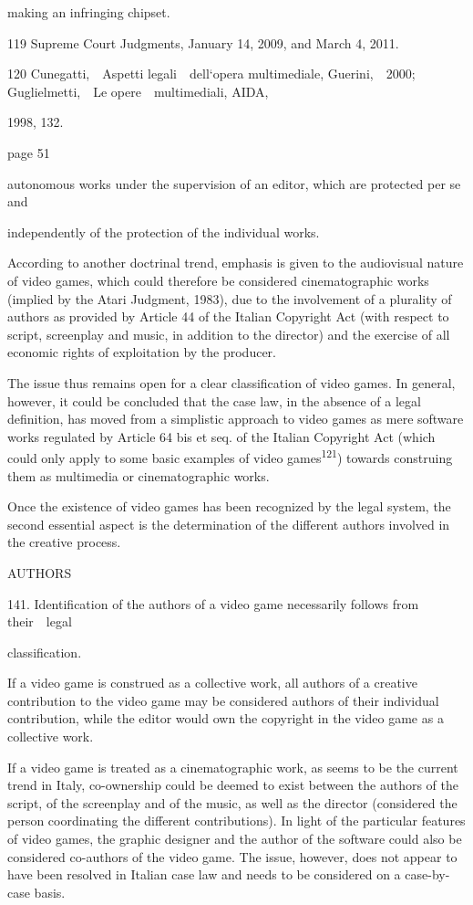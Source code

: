 \documentclass[
]{article}
\begin{document}
{making an infringing chipset.}

{119 }{Supreme Court Judgments, January 14, 2009, and March 4, 2011.}

{120 }{Cunegatti,~~}{Aspetti legali~~dell`opera multimediale}{,
Guerini,~~2000; Guglielmetti,~~}{Le opere~~multimediali}{, AIDA,}

{1998, 132.}

{page 51}

{autonomous works under the supervision of an editor, which are
protected }{per se }{and}

{independently of the protection of the individual works.}

{According to another doctrinal trend, emphasis is given to the
audiovisual nature of video games, which could therefore be considered
cinematographic works (implied by the Atari Judgment, 1983), due to the
involvement of a plurality of authors as provided by Article 44 of the
Italian }{Copyright Act }{(with respect to script, screenplay and music,
in addition to the director) and the exercise of all economic rights of
exploitation by the producer.}

{The issue thus remains open for a clear classification of video games.
In general, however, it could be concluded that the case law, in the
absence of a legal definition, has moved from a simplistic approach to
video games as mere software works regulated by Article 64 }{bis et seq.
}{of the Italian }{Copyright Act }{(which could only apply to some basic
examples of video games}\textsuperscript{{121}}{) towards construing
them as multimedia or cinematographic works.}

{Once the existence of video games has been recognized by the legal
system, the second essential aspect is the determination of the
different authors involved in the creative process.}

{AUTHORS}

{141. }{Identification of the authors of a video game necessarily
follows from their~~legal}

{classification.}

{If a video game is construed as a collective work, all authors of a
creative contribution to the video game may be considered authors of
their individual contribution, while the editor would own the copyright
in the video game as a collective work.}

{If a video game is treated as a cinematographic work, as seems to be
the current trend in Italy, co-ownership could be deemed to exist
between the authors of the script, of the screenplay and of the music,
as well as the director (considered the person coordinating the
different contributions). In light of the particular features of video
games, the graphic designer and the author of the software could also be
considered co-authors of the video game. The issue, however, does not
appear to have been resolved in Italian case law and needs to be
considered on a case-by-case basis.}
\end{document}
